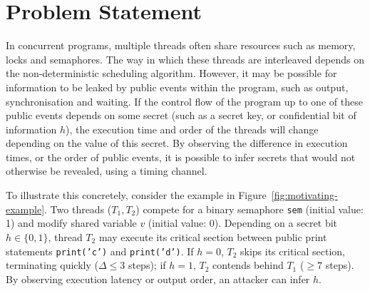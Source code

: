 \documentclass[a4paper,12pt]{report}
\begin{document}
\section{Problem Statement}
In concurrent programs, multiple threads often share resources such as memory, locks and semaphores. The way in which these threads are interleaved depends on the non-deterministic scheduling algorithm. However, it may be possible for information to be leaked by public events within the program, such as output, synchronisation and waiting. If the control flow of the program up to one of these public events depends on some secret (such as a secret key, or confidential bit of information $h$), the execution time and order of the threads will change depending on the value of this secret. By observing the difference in execution times, or the order of public events, it is possible to infer secrets that would not otherwise be revealed, using a timing channel.

To illustrate this concretely, consider the example in Figure~\ref{fig:motivating-example}. Two threads ($T_1, T_2$) compete for a binary semaphore \texttt{sem} (initial value: 1) and modify shared variable $v$ (initial value: 0). Depending on a secret bit $h \in \{0, 1\}$, thread $T_2$ may execute its critical section between public print statements \texttt{print('c')} and \texttt{print('d')}. If $h = 0$, $T_2$ skips its critical section, terminating quickly ($\Delta \le 3$ steps); if $h = 1$, $T_2$ contends behind $T_1$ ($\ge 7$ steps). By observing execution latency or output order, an attacker can infer $h$.
\end{document}
